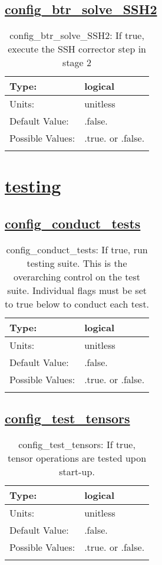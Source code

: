 \subsection[config\_btr\_solve\_SSH2]{\hyperref[sec:nm_tab_split_explicit_ts]{config\_btr\_solve\_SSH2}}
\label{subsec:nm_sec_config_btr_solve_SSH2}
\begin{center}
\begin{longtable}{| p{2.0in} || p{4.0in} |}
    \hline
    Type: & logical \\
    \hline
    Units: & \si{unitless} \\
    \hline
    Default Value: & .false. \\
    \hline
    Possible Values: & .true. or .false. \\
    \hline
    \caption{config\_btr\_solve\_SSH2: If true, execute the SSH corrector step in stage 2}
\end{longtable}
\end{center}
\section[testing]{\hyperref[sec:nm_tab_testing]{testing}}
\label{sec:nm_sec_testing}
\subsection[config\_conduct\_tests]{\hyperref[sec:nm_tab_testing]{config\_conduct\_tests}}
\label{subsec:nm_sec_config_conduct_tests}
\begin{center}
\begin{longtable}{| p{2.0in} || p{4.0in} |}
    \hline
    Type: & logical \\
    \hline
    Units: & \si{unitless} \\
    \hline
    Default Value: & .false. \\
    \hline
    Possible Values: & .true. or .false. \\
    \hline
    \caption{config\_conduct\_tests: If true, run testing suite. This is the overarching control on the test suite. Individual flags must be set to true below to conduct each test.}
\end{longtable}
\end{center}
\subsection[config\_test\_tensors]{\hyperref[sec:nm_tab_testing]{config\_test\_tensors}}
\label{subsec:nm_sec_config_test_tensors}
\begin{center}
\begin{longtable}{| p{2.0in} || p{4.0in} |}
    \hline
    Type: & logical \\
    \hline
    Units: & \si{unitless} \\
    \hline
    Default Value: & .false. \\
    \hline
    Possible Values: & .true. or .false. \\
    \hline
    \caption{config\_test\_tensors: If true, tensor operations are tested upon start-up.}
\end{longtable}
\end{center}
